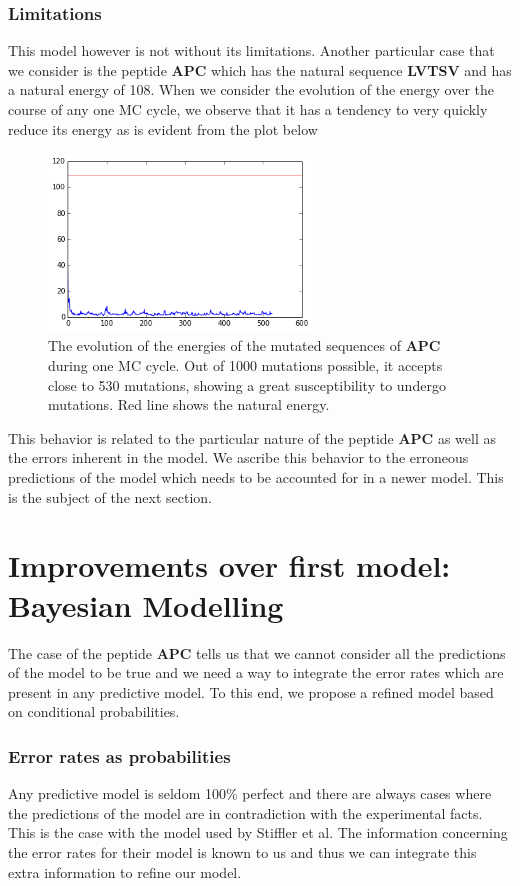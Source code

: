 \documentclass[a4paper, 12pt]{article}
\begin{document}
 	\section{Limitations}

 	This model however is not without its limitations. Another particular case that we consider is the peptide \textbf{APC} which has the natural sequence \textbf{LVTSV} and has a natural energy of 108. When we consider the evolution of the energy over the course of any one MC cycle, we observe that it has a tendency to very quickly reduce its energy as is evident from the plot below

 	\begin{figure}[!h]
 	\label{apc_evol}
 	\centering
 	\includegraphics[width=7cm]{Images/apc_evol.png} 
 	\caption{The evolution of the energies of the mutated sequences of \textbf{APC} during one MC cycle. Out of 1000 mutations possible, it accepts close to 530 mutations, showing a great susceptibility to undergo mutations. Red line shows the natural energy.}
 	\end{figure} 

 	This behavior is related to the particular nature of the peptide \textbf{APC} as well as the errors inherent in the model. We ascribe this behavior to the erroneous predictions of the model which needs to be accounted for in a newer model. This is the subject of the next section. 
\pagebreak
\part{Improvements over first model: Bayesian Modelling}
	
	The case of the peptide \textbf{APC} tells us that we cannot consider all the predictions of the model to be true and we need a way to integrate the error rates which are present in any predictive model. To this end, we propose a refined model based on conditional probabilities.
\section{Error rates as probabilities}
	Any predictive model is seldom 100\% perfect and there are always cases where the predictions of the model are in contradiction with the experimental facts. This is the case with the model used by Stiffler et al. The information concerning the error rates for their model is known to us and thus we can integrate this extra information to refine our model. 
\end{document}
